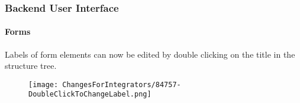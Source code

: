 
\begin{frame}[fragile]
	\frametitle{Backend User Interface}
	\framesubtitle{Forms}

	\lstset{basicstyle=\tiny\ttfamily}

	Labels of form elements can now be edited by double clicking on the title in the structure tree.

	\begin{figure}
		\texttt{[image: ChangesForIntegrators/84757-DoubleClickToChangeLabel.png]}
	\end{figure}

\end{frame}

